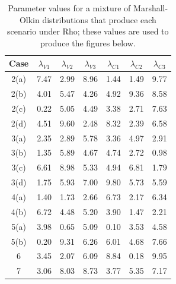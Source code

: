 \begin{table}[H]
\centering
\begin{tabular}{ccccccc}
    Case & $\lambda_{V1}$& $\lambda_{V2}$& $\lambda_{V3}$& $\lambda_{C1}$& $\lambda_{C2}$& $\lambda_{C3}$ \\ \hline
    2(a) & 7.47& 2.99& 8.96& 1.44& 1.49& 9.77\\
    2(b) & 4.01& 5.47& 4.26& 4.92& 9.36& 8.58\\
    2(c) & 0.22& 5.05& 4.49& 3.38& 2.71& 7.63\\
    2(d) & 4.51& 9.60& 2.48& 8.32& 2.39& 6.58\\
    3(a) & 2.35& 2.89& 5.78& 3.36& 4.97& 2.91\\
    3(b) & 1.35& 5.89& 4.67& 4.74& 2.72& 0.98\\
    3(c) & 6.61& 8.98& 5.33& 4.94& 6.81& 1.79\\
    3(d) & 1.75& 5.93& 7.00& 9.80& 5.73& 5.59\\
    4(a) & 1.40& 1.73& 2.66& 6.73& 2.17& 6.34\\
    4(b) & 6.72& 4.48& 5.20& 3.90& 1.47& 2.21\\
    5(a) & 3.98& 0.65& 5.09& 0.10& 3.53& 4.58\\
    5(b) & 0.20& 9.31& 6.26& 6.01& 4.68& 7.66\\
    6    & 3.45& 2.07& 6.09& 8.84& 0.18& 9.95\\
    7    & 3.06& 8.03& 8.73& 3.77& 5.35& 7.17\\
    \end{tabular}
    \caption{Parameter values for a mixture of Marshall-Olkin distributions that produce each scenario under Rho; these values are used to produce the figures below.}
    \label{tab:rho}
\end{table}
